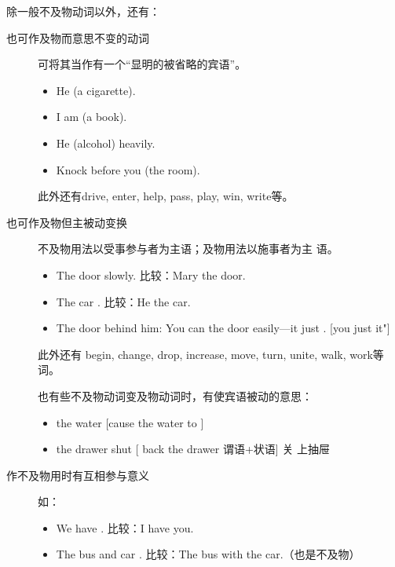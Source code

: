 除一般不及物动词以外，还有：
\begin{description}
\item[也可作及物而意思不变的动词] 可将其当作有一个“显明的被省略的宾语”。
  \begin{itemize}
  \item He  (a cigarette).

  \item I am  (a book).

  \item He  (alcohol) heavily.

  \item Knock before you  (the room).
  \end{itemize}此外还有drive, enter, help, pass, play, win, write等。

\item[也可作及物但主被动变换] 不及物用法以受事参与者为主语；及物用法以施事者为主
语。
  \begin{itemize}
  \item The door  slowly. 比较：Mary  the door.

  \item The car . 比较：He  the car.

  \item The door  behind him: You can  the door
easily---it just . [you just  it"]
  \end{itemize}此外还有 begin, change, drop, increase, move, turn, unite, walk,
work等词。

  也有些不及物动词变及物动词时，有使宾语被动的意思：
  \begin{itemize}
  \item {} the water [cause the water to ]

  \item {} the drawer shut [ back the drawer 谓语+状语] 关
上抽屉
  \end{itemize}

\item[作不及物用时有互相参与意义] 如：
  \begin{itemize}
  \item We have . 比较：I have  you.

  \item The bus and car . 比较：The bus  with the
car.（也是不及物）
  \end{itemize}
\end{description}

